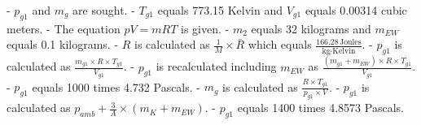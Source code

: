 - \( p_{g1} \) and \( m_g \) are sought.
- \( T_{g1} \) equals 773.15 Kelvin and \( V_{g1} \) equals 0.00314 cubic meters.
- The equation \( pV = mRT \) is given.
- \( m_2 \) equals 32 kilograms and \( m_{EW} \) equals 0.1 kilograms.
- \( R \) is calculated as \( \frac{1}{M} \times \bar{R} \) which equals \( \frac{166.28 \, \text{Joules}}{\text{kg} \cdot \text{Kelvin}} \).
- \( p_{g1} \) is calculated as \( \frac{m_{g1} \times R \times T_{g1}}{V_{g1}} \).
- \( p_{g1} \) is recalculated including \( m_{EW} \) as \( \frac{(m_{g1} + m_{EW}) \times R \times T_{g1}}{V_{g1}} \).
- \( p_{g1} \) equals 1000 times 4.732 Pascals.
- \( m_g \) is calculated as \( \frac{R \times T_{g1}}{p_{g1} \times V} \).
- \( p_{g1} \) is calculated as \( p_{amb} + \frac{3}{A} \times (m_{K} + m_{EW}) \).
- \( p_{g1} \) equals 1400 times 4.8573 Pascals.